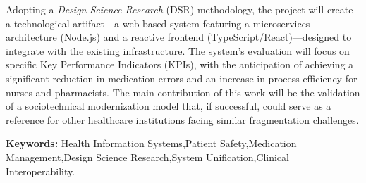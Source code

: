 Adopting a \textit{Design Science Research} (DSR) methodology, the project will create a technological artifact---a web-based system featuring a microservices architecture (Node.js) and a reactive frontend (TypeScript/\-React)---designed to integrate with the existing infrastructure. The system's evaluation will focus on specific Key Performance Indicators (KPIs), with the anticipation of achieving a significant reduction in medication errors and an increase in process efficiency for nurses and pharmacists. The main contribution of this work will be the validation of a socio\-technical modernization model that, if successful, could serve as a reference for other healthcare institutions facing similar fragmentation challenges.

\vspace{6mm}
{\raggedright\noindent\textbf{Keywords:} Health Information Systems,\allowbreak Patient Safety,\allowbreak Medication Management,\allowbreak Design Science Research,\allowbreak System Unification,\allowbreak Clinical Interoperability.\par}
\endgroup 
